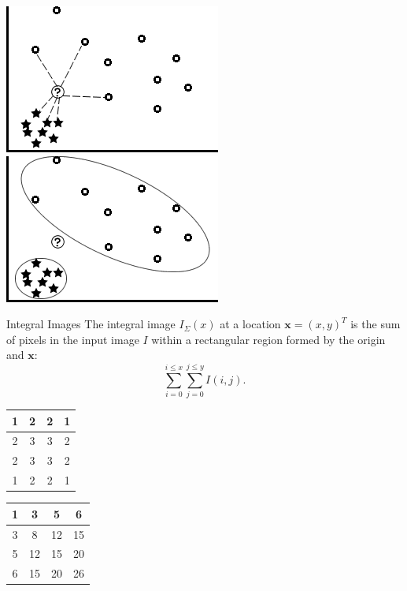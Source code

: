 \documentclass[xcolor=dvipsnames]{beamer}
\begin{document}
\begin{frame}
\begin{center}
 \includegraphics[width=.5\textwidth]{imgs/ex_euc_dist-fw.png}
 \includegraphics[width=.5\textwidth]{imgs/ex_mah_dist-fw.png}
\end{center}
\end{frame}

\begin{frame}[label=math-integral]{Integral Images}
 The integral image $I_\Sigma(x)$ at a location $\mathbf{x} = (x, y)^T$ is the sum of pixels in the input image $I$ within a rectangular region formed by the origin and $\mathbf{x}$:
 \begin{equation} \label{eq:integral}
  \sum_{i=0}^{i\leq x} \sum_{j=0}^{j\leq y} I(i,j).
 \end{equation}
\end{frame}

\begin{frame}
\begin{minipage}{.45\linewidth}\centering
 \begin{tabular}{c|c|c|c}
  1 & 2 & 2 & 1 \\ \hline
  2 & 3 & 3 & 2 \\ \hline
  2 & 3 & 3 & 2 \\ \hline
  1 & 2 & 2 & 1 \\ \hline
 \end{tabular}
\end{minipage}
\begin{minipage}{.45\linewidth}\centering
 \begin{tabular}{c|c|c|c}
  1 & 3  & 5  & 6  \\ \hline
  3 & 8  & 12 & 15 \\ \hline
  5 & 12 & 15 & 20 \\ \hline
  6 & 15 & 20 & 26 \\ \hline
 \end{tabular}
\end{minipage}
\end{frame}
\end{document}
